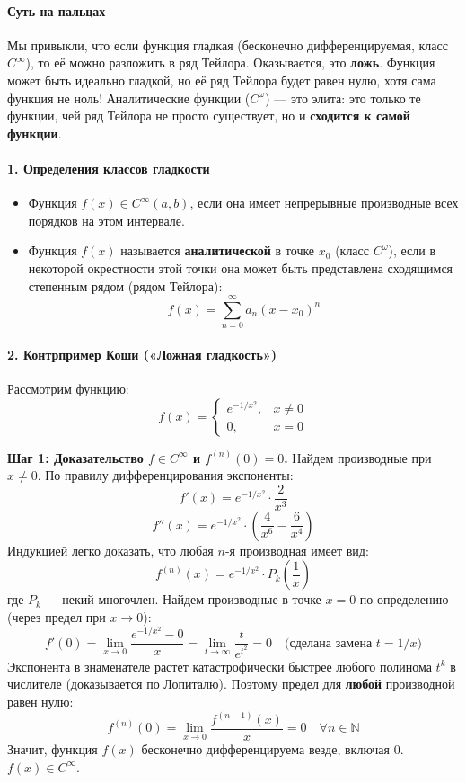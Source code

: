 \paragraph{Суть на пальцах}
Мы привыкли, что если функция гладкая (бесконечно дифференцируемая, класс $C^\infty$), то её можно разложить в ряд Тейлора. Оказывается, это \textbf{ложь}. Функция может быть идеально гладкой, но её ряд Тейлора будет равен нулю, хотя сама функция не ноль! Аналитические функции ($C^\omega$) — это элита: это только те функции, чей ряд Тейлора не просто существует, но и \textbf{сходится к самой функции}. 

\paragraph{1. Определения классов гладкости}
\begin{itemize}
    \item Функция $f(x) \in C^\infty(a, b)$, если она имеет непрерывные производные всех порядков на этом интервале.
    \item Функция $f(x)$ называется \textbf{аналитической} в точке $x_0$ (класс $C^\omega$), если в некоторой окрестности этой точки она может быть представлена сходящимся степенным рядом (рядом Тейлора): 
    $$ f(x) = \sum_{n=0}^{\infty} a_n (x - x_0)^n $$
\end{itemize}

\paragraph{2. Контрпример Коши («Ложная гладкость»)}
Рассмотрим функцию:
$$ f(x) = \begin{cases} e^{-1/x^2}, & x \ne 0 \\ 0, & x = 0 \end{cases} $$

\textbf{Шаг 1: Доказательство $f \in C^\infty$ и $f^{(n)}(0) = 0$.}
Найдем производные при $x \ne 0$. По правилу дифференцирования экспоненты:
$$ f'(x) = e^{-1/x^2} \cdot \frac{2}{x^3} $$
$$ f''(x) = e^{-1/x^2} \cdot \left( \frac{4}{x^6} - \frac{6}{x^4} \right) $$
Индукцией легко доказать, что любая $n$-я производная имеет вид:
$$ f^{(n)}(x) = e^{-1/x^2} \cdot P_k\left(\frac{1}{x}\right) $$
где $P_k$ — некий многочлен. 
Найдем производные в точке $x = 0$ по определению (через предел при $x \to 0$):
$$ f'(0) = \lim_{x \to 0} \frac{e^{-1/x^2} - 0}{x} = \lim_{t \to \infty} \frac{t}{e^{t^2}} = 0 \quad \text{(сделана замена } t = 1/x \text{)} $$
Экспонента в знаменателе растет катастрофически быстрее любого полинома $t^k$ в числителе (доказывается по Лопиталю). Поэтому предел для \textbf{любой} производной равен нулю:
$$ f^{(n)}(0) = \lim_{x \to 0} \frac{f^{(n-1)}(x)}{x} = 0 \quad \forall n \in \mathbb{N} $$
Значит, функция $f(x)$ бесконечно дифференцируема везде, включая $0$. $f(x) \in C^\infty$.

